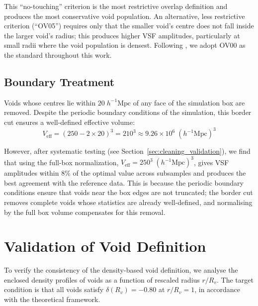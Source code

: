 \documentclass[12pt]{report}
\begin{document}
This ``no-touching'' criterion is the most restrictive overlap definition and produces the most conservative void population. An alternative, less restrictive criterion (``OV05'') requires only that the smaller void's centre does not fall inside the larger void's radius; this produces higher VSF amplitudes, particularly at small radii where the void population is densest. Following \citet{Sartori2025}, we adopt OV00 as the standard throughout this work.

\subsection{Boundary Treatment}

Voids whose centres lie within $20\;h^{-1}\mathrm{Mpc}$ of any face of the simulation box are removed. Despite the periodic boundary conditions of the simulation, this border cut ensures a well-defined effective volume:
\begin{equation}
    V_\mathrm{eff} = (250 - 2 \times 20)^3 = 210^3 \approx 9.26 \times 10^6\;(h^{-1}\mathrm{Mpc})^3
\end{equation}

However, after systematic testing (see Section~\ref{sec:cleaning_validation}), we find that using the full-box normalization, $V_\mathrm{eff} = 250^3\;(h^{-1}\mathrm{Mpc})^3$, gives VSF amplitudes within 8\% of the optimal value across subsamples and produces the best agreement with the reference data. This is because the periodic boundary conditions ensure that voids near the box edges are not truncated; the border cut removes complete voids whose statistics are already well-defined, and normalising by the full box volume compensates for this removal.


\section{Validation of Void Definition}
\label{sec:void_validation}

To verify the consistency of the density-based void definition, we analyse the enclosed density profiles of voids as a function of rescaled radius $r/R_v$. The target condition is that all voids satisfy $\delta(R_v) = -0.80$ at $r/R_v = 1$, in accordance with the theoretical framework.
\end{document}

